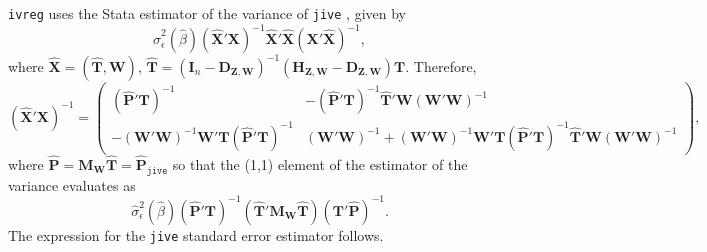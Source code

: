 \documentclass{mynotes}
\newcommand{\bx}{\mathbf{X}} %
\newcommand{\bt}{\mathbf{T}} %
\newcommand{\bz}{\mathbf{Z}} %
\newcommand{\bp}{\mathbf{P}} %
\newcommand{\bw}{\mathbf{W}} %
\newcommand{\eye}{\mathbf{I}} %
\newcommand{\Hm}[1]{\mathbf{H}_{#1}} %
\newcommand{\Dm}[1]{\mathbf{D}_{#1}} %
\newcommand{\Mm}[1]{\mathbf{M}_{#1}} %
\begin{document}
\begin{appendices}
\lstinline!ivreg! uses the Stata estimator of the variance of \texttt{jive}
\citep{poi06}, given by
\begin{equation*}
    \hat{\sigma}^{2}_{\epsilon}(\hat{\beta})(\hat{\bx}'\bx)^{-1}\hat{\bx}'\hat{\bx}(\bx'\hat{\bx})^{-1},
\end{equation*}
where $\hat{\bx}=(\hat{\bt},\bw)$,
$\hat{\bt}=(\eye_{n}-\Dm{\bz,\bw})^{-1}(\Hm{\bz,\bw}-\Dm{\bz,\bw})\bt$.
Therefore,
\begin{equation*}
  (\hat{\bx}'\bx)^{-1}=
  \begin{pmatrix}
    (\hat{\bp}'\bt)^{-1}&-
    (\hat{\bp}'\bt)^{-1}\hat{\bt}'\bw(\bw'\bw)^{-1}\\
    -(\bw'\bw)^{-1} \bw'\bt(\hat{\bp}'\bt)^{-1}& (\bw'\bw)^{-1}+(\bw'\bw)^{-1}
    \bw'\bt (\hat{\bp}'\bt)^{-1} \hat{\bt}'\bw(\bw'\bw)^{-1}
  \end{pmatrix},
\end{equation*}
where $\hat{\bp}=\Mm{\bw}\hat{\bt}=\hat{\bp}_{\mathtt{jive}}$ so that the (1,1)
element of the estimator of the variance evaluates as
\begin{equation*}
    \hat{\sigma}^{2}_{\epsilon}(\hat{\beta})(\hat{\bp}'\bt)^{-1}  (\hat{\bt}'\Mm{\bw}\hat{\bt})(\bt'\hat{\bp})^{-1}.
\end{equation*}
The expression for the \texttt{jive} standard error estimator follows.


\end{appendices}
\end{document}
